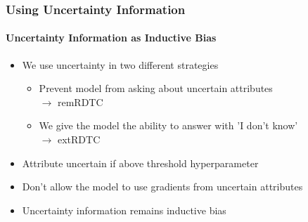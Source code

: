 \documentclass[9pt]{beamer}
\begin{document}
\begin{frame}	
\frametitle{Using Uncertainty Information}
\framesubtitle{Uncertainty Information as Inductive Bias}
\begin{itemize}
	\item We use uncertainty in two different strategies
	\begin{itemize}
		\item Prevent model from asking about uncertain attributes\\$\rightarrow$ remRDTC
		\item We give the model the ability to answer with 'I don't know'\\$\rightarrow$ extRDTC
	\end{itemize}
	\item Attribute uncertain if above threshold hyperparameter
	\item Don't allow the model to use gradients from uncertain attributes
	\item Uncertainty information remains inductive bias%
\end{itemize}
\end{frame}
\end{document}
